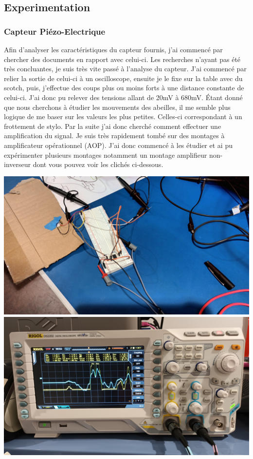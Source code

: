 \documentclass[12pt,french,a4paper]{article}
\begin{document}
\subsection{Experimentation}

\subsubsection{Capteur Piézo-Electrique}

Afin d'analyser les caractéristiques du capteur fournis, j'ai commencé par chercher des documents en rapport avec celui-ci. Les recherches n'ayant pas 
été très concluantes, je suis très vite passé à l'analyse du capteur. J'ai commencé par relier la sortie de celui-ci à un oscilloscope, ensuite je le fixe
sur la table avec du scotch, puis, j'effectue des coups plus ou moins forts à une distance constante de celui-ci. J'ai donc pu relever des tensions allant de 20mV à 680mV.
Étant donné que nous cherchons à étudier les mouvements des abeilles, il me semble plus logique de me baser sur les valeurs les plus petites. Celles-ci correspondant à un frottement de stylo.
Par la suite j'ai donc cherché comment effectuer une amplification du signal. Je suis très rapidement tombé sur des montages à amplificateur opérationnel (AOP). J'ai donc commencé
à les étudier et ai pu expérimenter plusieurs montages notamment un montage amplifieur non-inverseur dont vous pouvez voir les clichés ci-dessous.
\begin{center}	
	\includegraphics[scale=0.08]{../img/montage_piezo_aop.jpg}
	\label{image3}
	\includegraphics[scale=0.08]{../img/sortie_osciloscope.jpg}
	\label{image4}
\end{center}
\end{document}
